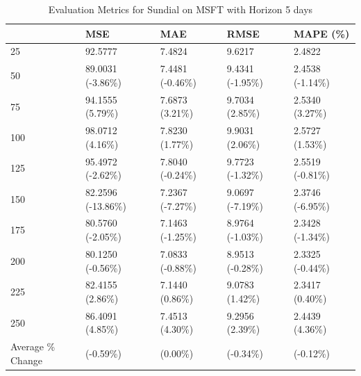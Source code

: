 \begin{table}
\caption{Evaluation Metrics for Sundial on MSFT with Horizon 5 days}
\label{tab:sundial_MSFT_h5_metrics}
\begin{tabular}{lllll}
\toprule
 & MSE & MAE & RMSE & MAPE (\%) \\
\midrule
25 & 92.5777 & 7.4824 & 9.6217 & 2.4822 \\
50 & 89.0031 (-3.86\%) & 7.4481 (-0.46\%) & 9.4341 (-1.95\%) & 2.4538 (-1.14\%) \\
75 & 94.1555 (5.79\%) & 7.6873 (3.21\%) & 9.7034 (2.85\%) & 2.5340 (3.27\%) \\
100 & 98.0712 (4.16\%) & 7.8230 (1.77\%) & 9.9031 (2.06\%) & 2.5727 (1.53\%) \\
125 & 95.4972 (-2.62\%) & 7.8040 (-0.24\%) & 9.7723 (-1.32\%) & 2.5519 (-0.81\%) \\
150 & 82.2596 (-13.86\%) & 7.2367 (-7.27\%) & 9.0697 (-7.19\%) & 2.3746 (-6.95\%) \\
175 & 80.5760 (-2.05\%) & 7.1463 (-1.25\%) & 8.9764 (-1.03\%) & 2.3428 (-1.34\%) \\
200 & 80.1250 (-0.56\%) & 7.0833 (-0.88\%) & 8.9513 (-0.28\%) & 2.3325 (-0.44\%) \\
225 & 82.4155 (2.86\%) & 7.1440 (0.86\%) & 9.0783 (1.42\%) & 2.3417 (0.40\%) \\
250 & 86.4091 (4.85\%) & 7.4513 (4.30\%) & 9.2956 (2.39\%) & 2.4439 (4.36\%) \\
Average \% Change & (-0.59\%) & (0.00\%) & (-0.34\%) & (-0.12\%) \\
\bottomrule
\end{tabular}
\end{table}
